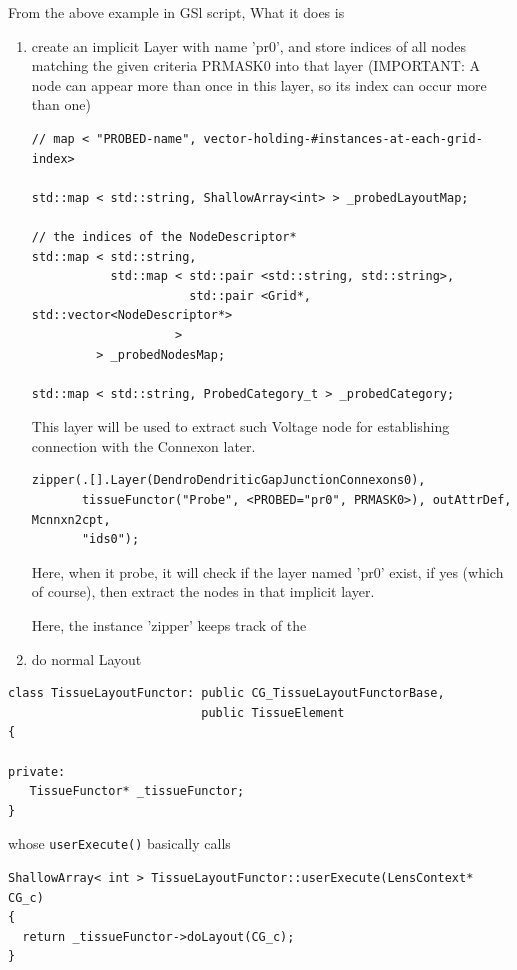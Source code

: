 From the above example in GSl script, What it does is
\begin{enumerate}
  \item create an implicit Layer with name 'pr0', and store indices of all nodes
  matching the given criteria PRMASK0 into that layer (IMPORTANT: A node can
  appear more than once in this layer, so its index can occur more than one)

\begin{verbatim}
// map < "PROBED-name", vector-holding-#instances-at-each-grid-index>

std::map < std::string, ShallowArray<int> > _probedLayoutMap;

// the indices of the NodeDescriptor* 
std::map < std::string, 
           std::map < std::pair <std::string, std::string>, 
                      std::pair <Grid*, std::vector<NodeDescriptor*>
                    >
         > _probedNodesMap;
 
std::map < std::string, ProbedCategory_t > _probedCategory; 

\end{verbatim}
  
  This layer will be used to extract such Voltage node for establishing
  connection with the Connexon later.
\begin{verbatim}
zipper(.[].Layer(DendroDendriticGapJunctionConnexons0), 
       tissueFunctor("Probe", <PROBED="pr0", PRMASK0>), outAttrDef, Mcnnxn2cpt,
       "ids0");
\end{verbatim}
Here, when it probe, it will check if the layer named 'pr0' exist, if yes
(which of course), then extract the nodes in that implicit layer. 

Here, the instance 'zipper' keeps track of the 
  
  \item do normal Layout
\end{enumerate}


\begin{lstlisting}
class TissueLayoutFunctor: public CG_TissueLayoutFunctorBase,
                           public TissueElement
{

private:
   TissueFunctor* _tissueFunctor;
}
\end{lstlisting}

whose \verb!userExecute()! basically calls
\begin{verbatim}
ShallowArray< int > TissueLayoutFunctor::userExecute(LensContext* CG_c) 
{
  return _tissueFunctor->doLayout(CG_c);
}
\end{verbatim}


